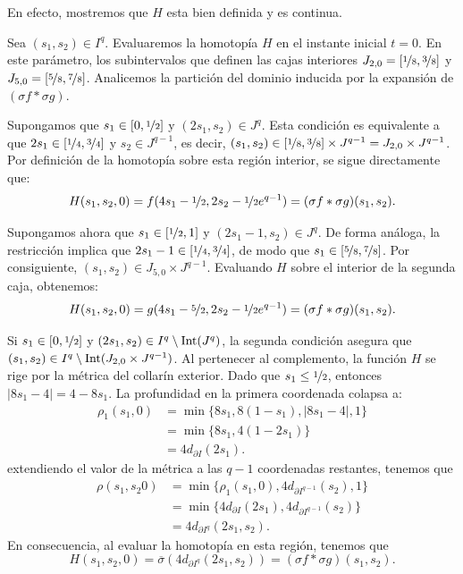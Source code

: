 \begin{dem}
    En efecto, mostremos que $H$ esta bien definida y es continua. 
    
    Sea $(s_1,s_2) \in I^q$. Evaluaremos la homotopía $H$ en el instante inicial $t=0$. En este parámetro, los subintervalos que definen las cajas interiores  $J_{2,0} = [\nicefrac{1}{8}, \nicefrac{3}{8}]$ y $J_{5,0} = [\nicefrac{5}{8}, \nicefrac{7}{8}]$. Analicemos la partición del dominio inducida por la expansión de $(\sigma f * \sigma g)$.

    Supongamos que $s_1 \in [0, \nicefrac{1}{2}]$ y $(2s_1, s_2) \in J^q$. Esta condición es equivalente a que $2s_1 \in [\nicefrac{1}{4}, \nicefrac{3}{4}]$ y $s_2 \in J^{q-1}$, es decir, $(s_1, s_2) \in [\nicefrac{1}{8}, \nicefrac{3}{8}] \times J^{q-1} = J_{2,0} \times J^{q-1}$. Por definición de la homotopía sobre esta región interior, se sigue directamente que:
    \[
        H(s_1, s_2, 0) = f(4s_1 - \nicefrac{1}{2}, 2s_2 - \nicefrac{1}{2}e^{q-1}) = (\sigma f * \sigma g)(s_1, s_2).
    \]

    Supongamos ahora que $s_1 \in [\nicefrac{1}{2}, 1]$ y $(2s_1 - 1, s_2) \in J^q$. De forma análoga, la restricción implica que $2s_1 - 1 \in [\nicefrac{1}{4}, \nicefrac{3}{4}]$, de modo que $s_1 \in [\nicefrac{5}{8}, \nicefrac{7}{8}]$. Por consiguiente, $(s_1, s_2) \in J_{5,0} \times J^{q-1}$. Evaluando $H$ sobre el interior de la segunda caja, obtenemos:
    \[
        H(s_1, s_2, 0) = g(4s_1 - \nicefrac{5}{2}, 2s_2 - \nicefrac{1}{2}e^{q-1}) = (\sigma f * \sigma g)(s_1, s_2).
    \]

    Si $s_1 \in [0, \nicefrac{1}{2}]$ y $(2s_1, s_2) \in I^q \setminus \mathrm{Int}(J^q)$, la segunda condición asegura que $(s_1, s_2) \in I^q\setminus\mathrm{Int}(J_{2,0} \times J^{q-1})$. Al pertenecer al complemento, la función $H$ se rige por la métrica del collarín exterior. Dado que $s_1 \leq \nicefrac{1}{2}$, entonces $|8s_1 - 4| = 4 - 8s_1$. La profundidad en la primera coordenada colapsa a:
    \begin{align*}
        \rho_1(s_1, 0) &= \min\big\{8s_1, 8(1-s_1), |8s_1 - 4|, 1\big\} \\
        &= \min\big\{8s_1, 4(1-2s_1)\big\} \\
        &= 4d_{\partial I}(2s_1).
    \end{align*}
    extendiendo el valor de la métrica a las $q-1$ coordenadas restantes, tenemos que
    \begin{align*}
        \rho(s_1,s_2 0)&= \min\big\{\rho_1(s_1,0), 4d_{\partial I^{q-1}}(s_2), 1\big\} \\
        &=\min\big\{4d_{\partial I}(2s_1), 4d_{\partial I^{q-1}}(s_2)\big\} \\
        &= 4d_{\partial I^q}(2s_1, s_2).
    \end{align*}
    En consecuencia, al evaluar la homotopía en esta región, tenemos que
    \[
        H(s_1, s_2, 0) = \overline{\sigma}(4d_{\partial I^q}(2s_1, s_2)) = (\sigma f * \sigma g)(s_1, s_2).
    \]


\end{dem}
